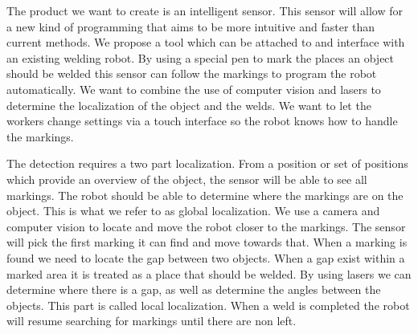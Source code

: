 
The product we want to create is an intelligent sensor.
This sensor will allow for a new kind of programming that aims to be more intuitive and faster than current methods.
We propose a tool which can be attached to and interface with an existing welding robot. 
By using a special pen to mark the places an object should be welded this sensor can follow the markings to program the robot automatically.
We want to combine the use of computer vision and lasers to determine the localization of the object and the welds.
We want to let the workers change settings via a touch interface so the robot knows how to handle the markings. 

The detection requires a two part localization. 
From a position or set of positions which provide an overview of the object, the sensor will be able to see all markings.
The robot should be able to determine where the markings are on the object. 
This is what we refer to as global localization.
We use a camera and computer vision to locate and move the robot closer to the markings.
The sensor will pick the first marking it can find and move towards that. 
When a marking is found we need to locate the gap between two objects. 
When a gap exist within a marked area it is treated as a place that should be welded.
By using lasers we can determine where there is a gap, as well as determine the angles between the objects.
This part is called local localization.
When a weld is completed the robot will resume searching for markings until there are non left.